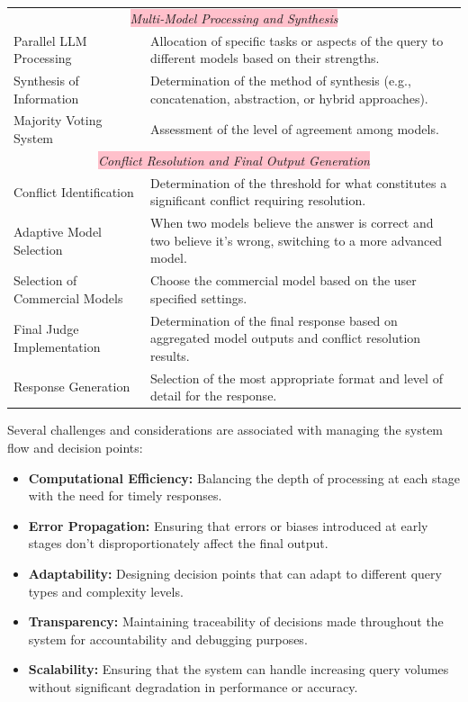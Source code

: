 \begin{table}[ht!]
{\begin{tabular}{lp{11cm}}
            \hline
            \multicolumn{2}{c}{\colorbox{pink}{\textit{Multi-Model Processing and Synthesis}}} \\
            Parallel LLM Processing & Allocation of specific tasks or aspects of the query to different models based on their strengths. \\
            Synthesis of Information & Determination of the method of synthesis (e.g., concatenation, abstraction, or hybrid approaches). \\
            Majority Voting System & Assessment of the level of agreement among models. \\
            \hline
            \multicolumn{2}{c}{\colorbox{pink}{\textit{Conflict Resolution and Final Output Generation}}} \\
            Conflict Identification & Determination of the threshold for what constitutes a significant conflict requiring resolution. \\
            Adaptive Model Selection & When two models believe the answer is correct and two believe it's wrong, switching to a more advanced model. \\
            Selection of Commercial Models & Choose the commercial model based on the user specified settings. \\
            Final Judge Implementation & Determination of the final response based on aggregated model outputs and conflict resolution results. \\
            Response Generation & Selection of the most appropriate format and level of detail for the response. \\
            \bottomrule
        \end{tabular}}
    \label{tab:system-decision-points}
\end{table}

Several challenges and considerations are associated with managing the system flow and decision points:
\begin{itemize}
    \item \textbf{Computational Efficiency:} Balancing the depth of processing at each stage with the need for timely responses.
    \item \textbf{Error Propagation:} Ensuring that errors or biases introduced at early stages don't disproportionately affect the final output.
    \item \textbf{Adaptability:} Designing decision points that can adapt to different query types and complexity levels.
    \item \textbf{Transparency:} Maintaining traceability of decisions made throughout the system for accountability and debugging purposes.
    \item \textbf{Scalability:} Ensuring that the system can handle increasing query volumes without significant degradation in performance or accuracy.
\end{itemize}

